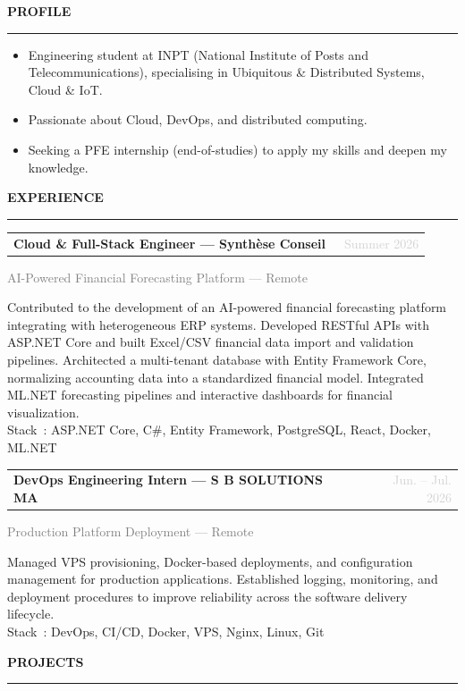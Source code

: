 \documentclass[10pt,a4paper]{article}
\makeatletter
\newcommand{\cvsection}[1]{%
  \vspace{6pt}%
  {\large\bfseries\color{heading}\MakeUppercase{#1}}\\[-3pt]%
  {\color{rulecolor}\rule{\linewidth}{1.2pt}}%
  \vspace{3pt}\par}
\newcommand{\cventry}[2]{%
  \noindent\begin{tabularx}{\linewidth}{@{}X r@{}}
    \textbf{#1} & {\small\textcolor{lightgray}{\faCalendar*\ #2}}
  \end{tabularx}\vspace{0pt}}
\newcommand{\cvsubline}[1]{%
  {\small\textcolor{graytext}{#1}}\par\vspace{1pt}}
\makeatother
\begin{document}
\noindent
\begin{minipage}[t]{0.585\linewidth}

\cvsection{Profile}

\begin{itemize}[leftmargin=1.2em, topsep=0pt]
  \item Engineering student at INPT (National Institute of Posts and
        Telecommunications), specialising in Ubiquitous \& Distributed Systems,
        Cloud \& IoT.
  \item Passionate about Cloud, DevOps, and distributed computing.
  \item Seeking a PFE internship (end-of-studies) to apply my skills and deepen
        my knowledge.
\end{itemize}

\cvsection{Experience}

\cventry{Cloud \& Full-Stack Engineer --- Synthèse Conseil}{Summer 2026}
\cvsubline{AI-Powered Financial Forecasting Platform --- Remote}
\noindent\small
Contributed to the development of an AI-powered financial forecasting
platform integrating with heterogeneous ERP systems. Developed RESTful APIs
with ASP.NET Core and built Excel/CSV financial data import and validation
pipelines. Architected a multi-tenant database with Entity Framework Core,
normalizing accounting data into a standardized financial model. Integrated
ML.NET forecasting pipelines and interactive dashboards for financial visualization.\\
Stack~: ASP.NET Core, C\#, Entity Framework, PostgreSQL, React, Docker, ML.NET

\vspace{4pt}

\cventry{DevOps Engineering Intern --- S B SOLUTIONS MA}{Jun. -- Jul. 2026}
\cvsubline{Production Platform Deployment --- Remote}
\noindent\small
Managed VPS provisioning, Docker-based deployments, and configuration management
for production applications. Established logging, monitoring, and deployment
procedures to improve reliability across the software delivery lifecycle.\\
Stack~: DevOps, CI/CD, Docker, VPS, Nginx, Linux, Git


\cvsection{Projects}


\end{minipage}
\end{document}
